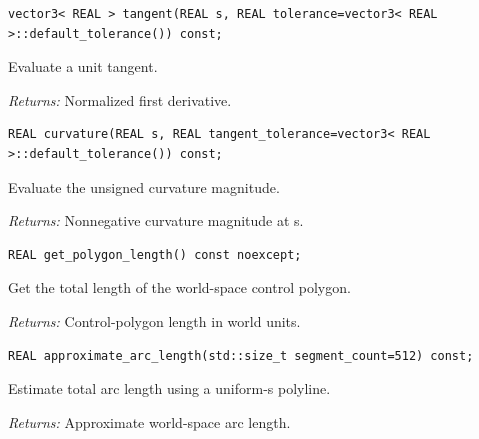 \par\noindent\begin{minipage}{\linewidth}
\begin{lstlisting}[style=apireference]
vector3< REAL > tangent(REAL s, REAL tolerance=vector3< REAL >::default_tolerance()) const;
\end{lstlisting}
{\footnotesize Evaluate a unit tangent.\par}
{\footnotesize\textit{Returns:} Normalized first derivative.\par}
\end{minipage}\par\vspace{1pt}
\par\noindent\begin{minipage}{\linewidth}
\begin{lstlisting}[style=apireference]
REAL curvature(REAL s, REAL tangent_tolerance=vector3< REAL >::default_tolerance()) const;
\end{lstlisting}
{\footnotesize Evaluate the unsigned curvature magnitude.\par}
{\footnotesize\textit{Returns:} Nonnegative curvature magnitude at s.\par}
\end{minipage}\par\vspace{1pt}
\par\noindent\begin{minipage}{\linewidth}
\begin{lstlisting}[style=apireference]
REAL get_polygon_length() const noexcept;
\end{lstlisting}
{\footnotesize Get the total length of the world-space control polygon.\par}
{\footnotesize\textit{Returns:} Control-polygon length in world units.\par}
\end{minipage}\par\vspace{1pt}
\par\noindent\begin{minipage}{\linewidth}
\begin{lstlisting}[style=apireference]
REAL approximate_arc_length(std::size_t segment_count=512) const;
\end{lstlisting}
{\footnotesize Estimate total arc length using a uniform-s polyline.\par}
{\footnotesize\textit{Returns:} Approximate world-space arc length.\par}
\end{minipage}\par\vspace{1pt}

